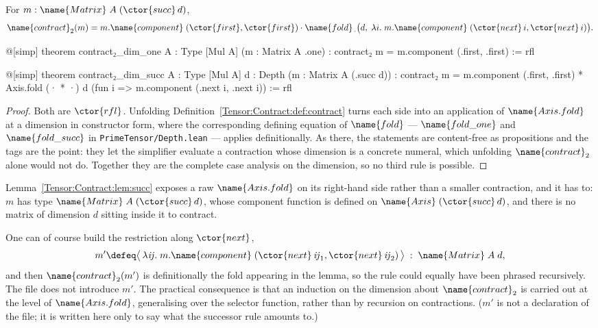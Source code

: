 \begin{lemma}
\label{Tensor:Contract:lem:succ}
For $m : \name{Matrix}\;A\;(\ctor{succ}\,d)$,
\[
  \name{contract}_2(m) =
    m.\name{component}\;(\ctor{first}, \ctor{first}) \cdot
      \name{fold}_{\,\cdot}\bigl(d,\;
        \lambda i.\; m.\name{component}\;
          (\ctor{next}\,i, \ctor{next}\,i)\bigr).
\]
\end{lemma}

\begin{leancode}
@[simp] theorem contract₂_dim_one {A : Type} [Mul A]
    (m : Matrix A .one) :
    contract₂ m = m.component (.first, .first) := rfl

@[simp] theorem contract₂_dim_succ {A : Type} [Mul A]
    {d : Depth} (m : Matrix A (.succ d)) :
    contract₂ m =
      m.component (.first, .first) *
        Axis.fold (· * ·) d (fun i => m.component (.next i, .next i)) := rfl
\end{leancode}

\begin{proof}
Both are $\ctor{rfl}$.  Unfolding
Definition~\ref{Tensor:Contract:def:contract} turns each side into an
application of $\name{Axis.fold}$ at a dimension in constructor form, where
the corresponding defining equation of $\name{fold}$ --- $\name{fold\_one}$
and $\name{fold\_succ}$ in \texttt{PrimeTensor/Depth.lean} --- applies
definitionally.  As there, the statements are content-free as propositions and
the  tags are the point: they let the simplifier evaluate a
contraction whose dimension is a concrete numeral, which unfolding
$\name{contract}_2$ alone would not do.  Together they are the complete case
analysis on the dimension, so no third rule is possible.
\end{proof}

\begin{remark}
\label{Tensor:Contract:rem:not-recursive}
Lemma~\ref{Tensor:Contract:lem:succ} exposes a raw
$\name{Axis.fold}$ on its right-hand side rather than a smaller contraction,
and it has to: $m$ has type $\name{Matrix}\;A\;(\ctor{succ}\,d)$, whose
component function is defined on $\name{Axis}\;(\ctor{succ}\,d)$, and there is
no matrix of dimension $d$ sitting inside it to contract.

One can of course build the restriction along $\ctor{next}$,
\[
  m' \defeq \bigl\langle\, \lambda \mathit{ij}.\;
    m.\name{component}\;(\ctor{next}\,\mathit{ij}_1,
      \ctor{next}\,\mathit{ij}_2) \,\bigr\rangle
  \;:\; \name{Matrix}\;A\;d,
\]
and then $\name{contract}_2(m')$ is definitionally the fold appearing in the
lemma, so the rule could equally have been phrased recursively.  The file does
not introduce $m'$.  The practical consequence is that an induction on the
dimension about $\name{contract}_2$ is carried out at the level of
$\name{Axis.fold}$, generalising over the selector function, rather than by
recursion on contractions.  ($m'$ is not a declaration of the file; it is
written here only to say what the successor rule amounts to.)
\end{remark}

